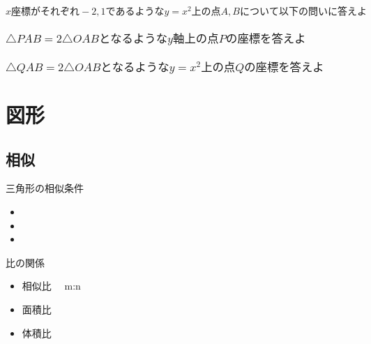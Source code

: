 \documentclass[10pt]{jsarticle}
\begin{document}
\begin{itembox}[l]{}
	$x座標がそれぞれ-2,1であるようなy=x^{2}上の点A,Bについて以下の問いに答えよ$
	\subsubsection{$\triangle PAB =2\triangle OABとなるようなy軸上の点Pの座標を答えよ$}
	\subsubsection{$\triangle QAB =2\triangle OABとなるようなy=x^{2}上の点Qの座標を答えよ$}
	\begin{spacing}{7}
	\end{spacing}
\end{itembox}

\newpage


\section{図形}
\subsection{相似}
\begin{itembox}[l]{三角形の相似条件}
	\begin{Large}
		\begin{itemize}
			\item
			\item
			\item
		\end{itemize}
	\end{Large}
\end{itembox}

\begin{itembox}[l]{比の関係}
	\begin{multicols}{3}
		\begin{itemize}
			\item 相似比　 {\Large m:n}
			\item 面積比
			\item 体積比
		\end{itemize}
	\end{multicols}
\end{itembox}
\end{document}

